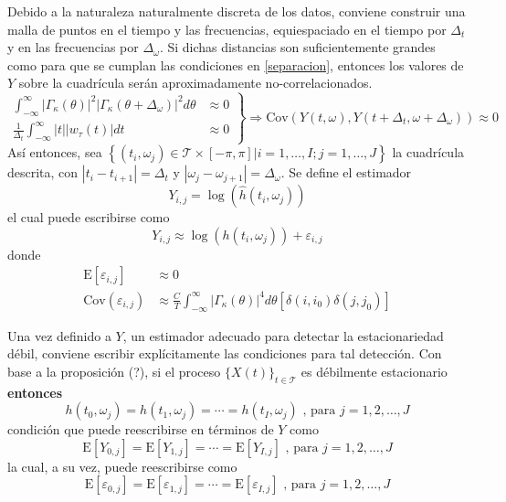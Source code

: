 \documentclass[12pt,letterpaper,draft]{book}
\newcommand{\intR}{\int_{-\infty}^{\infty}}
\newcommand{\E}[1]{\mathrm{E}\left[ #1 \right]}
\newcommand{\Cov}[1]{\mathrm{Cov}\left( #1 \right)}
\newcommand{\abso}[1]{\left| #1 \right|}
\newcommand{\xt}{$\{X(t)\}_{t\in \mathcal{T}}$ }
\begin{document}
Debido a la naturaleza naturalmente discreta de los datos, conviene construir una malla de puntos en el tiempo y las frecuencias, equiespaciado en el tiempo por $\Delta_t$ y en las frecuencias por $\Delta_\omega$.
%
Si dichas distancias son suficientemente grandes
como para que se cumplan las condiciones en \ref{separacion}, entonces los valores de $Y$
sobre la cuadrícula serán aproximadamente no-correlacionados.
%
\begin{equation}
\left.
\begin{aligned}
\intR \abso{\Gamma_\kappa(\theta)}^{2}\abso{\Gamma_\kappa(\theta+\Delta_\omega)}^{2} d\theta 
&\approx 0 \\
\frac{1}{\Delta_t} \intR \abso{t} \abso{w_\tau (t)} dt &\approx 0
\end{aligned}
\right\rbrace
\Rightarrow
\Cov{Y(t,\omega),Y(t+\Delta_t,\omega+\Delta_\omega)} \approx 0
\label{separacion}
\end{equation}
%
Así entonces, sea
$\left\{ (t_i,\omega_j) \in \mathcal{T} \times [-\pi,\pi] | i = 1,\dots,I ; j=1,\dots,J \right\}$
la cuadrícula descrita, con $\abso{t_i - t_{i+1}}= \Delta_t$ y 
$\abso{\omega_j-\omega_{j+1}}= \Delta_\omega$. 
%
Se define el estimador
\begin{equation}
Y_{i,j} = \log\left(\widehat{h}(t_i,\omega_j)\right)
\end{equation}
%
el cual puede escribirse como
\begin{equation}
Y_{i,j} \approx \log\left(h(t_i,\omega_j)\right) + \varepsilon_{i,j}
\label{def:ye}
\end{equation}
donde
\begin{align}
\E{\varepsilon_{i,j}} &\approx 0 \\
\Cov{\varepsilon_{i,j}} &\approx
\frac{C}{T} \intR \abso{\Gamma_\kappa(\theta)}^{4} d\theta \left[ \delta(i,i_0)\delta(j,j_0) \right]
\end{align}

Una vez definido a $Y$, un estimador adecuado para detectar la estacionariedad débil, conviene escribir explícitamente las condiciones para tal detección.
%
Con base a la proposición (?), si el proceso \xt es débilmente estacionario \textbf{entonces}
%
\begin{equation}
h(t_0,\omega_j) = h(t_1,\omega_j) = \cdots = h(t_I,\omega_j) \text{ , para } j = 1, 2, \dots , J
\label{h1}
\end{equation}
condición que puede reescribirse en términos de $Y$ como
%
\begin{equation}
\E{Y_{0,j}} = \E{Y_{1,j}} = \cdots = \E{Y_{I,j}} \text{ , para } j = 1, 2, \dots , J
\label{h2}
\end{equation}
%
la cual, a su vez, puede reescribirse como
\begin{equation}
\E{\varepsilon_{0,j}} = \E{\varepsilon_{1,j}} = \cdots = \E{\varepsilon_{I,j}} \text{ , para } j = 1, 2, \dots , J
\label{h3}
\end{equation}
\end{document}
